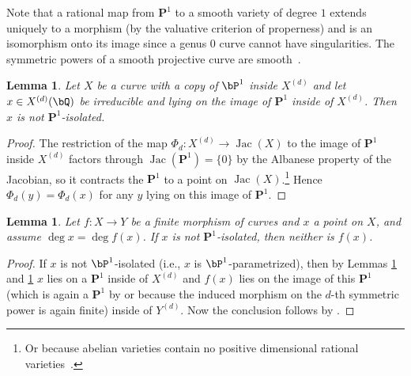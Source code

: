 \documentclass[11pt,reqno]{amsart}
\theoremstyle{plain}
\newtheorem{lemma}[theorem]{Lemma}
\theoremstyle{definition}
\newcommand{\Q}{\bQ}
\newcommand{\PP}{\mathbf P}
\newcommand{\Jac}{\operatorname{Jac}}
\begin{document}
Note that a rational map from $\PP^1$ to a smooth variety of degree $1$ extends uniquely to a morphism (by the valuative criterion of properness) and is an isomorphism onto its image since a genus $0$ curve cannot have singularities. The symmetric powers of a smooth projective curve are smooth~\cite[Proposition~3.2]{MilneJV}.

\begin{lemma} \label{lem:iso1}
Let $X$ be a curve with a copy of $\bP^1$ inside $X^{(d)}$ and let $x\in X^{(d)}(\Q)$ be irreducible and lying on the image of $\PP^1$ inside of $X^{(d)}$. Then $x$ is not $\PP^1$-isolated.
\end{lemma}
\begin{proof}
The restriction of the map $\Phi_d:X^{(d)}\rightarrow \Jac (X)$ to the image of $\PP^1$ inside $X^{(d)}$ factors through $\Jac(\PP^1)=\{0 \}$ by the Albanese property of the Jacobian, so it contracts the $\PP^1$ to a point on $\Jac(X)$.\footnote{Or because abelian varieties contain no positive dimensional rational varieties~\cite[Corollary~3.9]{MilneAV}.} Hence $\Phi_d(y) = \Phi_d(x)$ for any $y$ lying on this image of $\PP^1$. 
\end{proof}

\begin{lemma} \label{lem:iso2}
Let $f: X\rightarrow Y$ be a finite morphism of curves and $x$ a point on $X$, and assume  $\deg x = \deg f(x)$. If $x$ is not $\PP^1$-isolated, then neither is $f(x)$.
\end{lemma}
\begin{proof}
If $x$ is not $\bP^1$-isolated (i.e., $x$ is $\bP^1$-parametrized), then 
by Lemmas \ref{lem:iso1} and \ref{lem:iso2} $x$ lies on a $\PP^1$ inside of $X^{(d)}$ and $f(x)$ lies on the image of this $\PP^1$ (which is again a $\PP^1$ by  or because the induced morphism on the $d$-th symmetric power is again finite) inside of $Y^{(d)}$. Now the conclusion follows by .
\end{proof}
\end{document}
